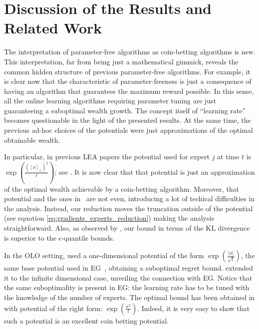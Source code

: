 \section{Discussion of the Results and Related Work}
\label{sec:discussion}

The interpretation of parameter-free algorithms as coin-betting algorithms is
new. This interpretation, far from being just a mathematical gimmick, reveals
the common hidden structure of previous parameter-free algorithms. For example,
it is clear now that the characteristic of parameter-freeness is just a
consequence of having an algorithm that guarantees the maximum reward possible.
In this sense, all the online learning algorithms requiring parameter tuning are
just guaranteeing a suboptimal wealth growth. The concept itself of ``learning
rate'' becomes questionable in the light of the presented results. At the same
time, the previous ad-hoc choices of the potentials were just approximations of
the optimal obtainable wealth.

In particular, in previous \ac{LEA} papers the potential used for expert $j$ at
time $t$ is $\exp \left(\frac{([x]_+)^2}{t} \right)$; see
\citep{ChaudhuriYH09,LuoE14,LuoS15}. It is now clear that that potential is just
an approximation of the optimal wealth achievable by a coin-betting algorithm.
Moreover, that potential and the ones in~\citet{ChernovV10,KoolenE15} are not
even, introducing a lot of techical difficulties in the analysis. Instead, our
reduction moves the truncation outside of the potential (see equation
\eqref{eq:gradients_experts_reduction}) making the analysis straightforward.
Also, as observed by \citet{ChernovV10}, our bound in terms of the KL divergence
is superior to the $\epsilon$-quantile bounds.

In the \ac{OLO} setting, \citet{StreeterM12} used a one-dimensional potential of
the form $\exp \left(\frac{|x|}{\sqrt{t}}\right)$, the same base potential used in EG~\citep{KivinenW97}, obtaining a suboptimal regret bound.
\citet{Orabona13} extended it to the infinite dimensional case, unveiling the connection with EG. 
Notice that the same suboptimality is present in EG: the learning rate has to be tuned with the knowledge of the number of experts.
The optimal
bound has been obtained in \citet{McMahanO14} with potential of the right form:
$\exp \left(\frac{x^2}{t}\right)$. Indeed, it is very easy to show that such a
potential is an excellent coin betting potential.

